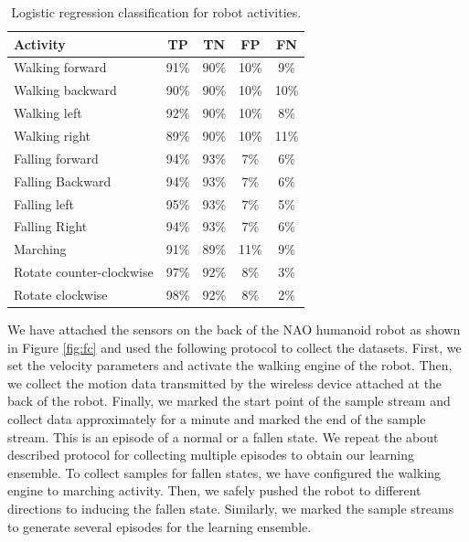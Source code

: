 \documentclass[letterpaper]{article}
\begin{document}
\begin{sloppy}
\begin{table}[!ht]
\caption{Logistic regression classification for robot activities.}
	\label{tab:robot-logistic-class}
	\centering
		\begin{tabular} {| l | c | c | c| c|}
		\hline
			{\bf Activity} & {\bf  TP}  &	{\bf TN}  &	{\bf FP} &	{\bf FN} \\ 
\hline
			Walking forward	& 91\%	& 90\%	& 10\%	& 9\% \\ \hline
			Walking backward	& 90\%	& 90\%	& 10\%	& 10\% \\ \hline
			Walking left 	& 92\%	& 90\%	& 10\%	& 8\% \\ \hline
			Walking right 	& 89\%	& 90\%	& 10\%	& 11\% \\ \hline
			Falling forward	& 94\%	& 93\%	& 7\%	& 6\%	 \\ \hline
			Falling Backward	& 94\%	& 93\%	& 7\%	& 6\%	 \\ \hline
			Falling left	& 95\%	& 93\%	& 7\%	& 5\%	 \\ \hline
			Falling Right	& 94\%	& 93\%	& 7\%	& 6\%	 \\ \hline
			Marching	& 91\%	& 89\%	& 11\%	& 9\%	 \\ \hline
			Rotate counter-clockwise	& 97\%	& 92\%	& 8\%	& 3\%	 \\ \hline
			Rotate clockwise	& 98\%	& 92\%	& 8\%	& 2\%	 \\ \hline
		\end{tabular}
\end{table}



We have attached the sensors on the back of the NAO humanoid robot as shown in Figure \ref{fig:fc} 
and used the following protocol to collect the datasets. First, we set the velocity 
parameters and activate the walking engine of the robot. Then, we collect the motion data 
transmitted by the wireless device attached at the back of the robot. Finally, we marked the start 
point of the sample stream and collect data approximately for a minute and marked the end of the 
sample stream. This is an episode of a normal  or a fallen state. We repeat the about described 
protocol for collecting multiple episodes to obtain our learning ensemble. To collect samples for 
fallen states, we have configured the walking engine to marching activity. Then, we safely pushed 
the robot to different directions to inducing the fallen state. Similarly, we marked the sample 
streams to generate several episodes for the learning ensemble.    


\end{sloppy}
\end{document}
